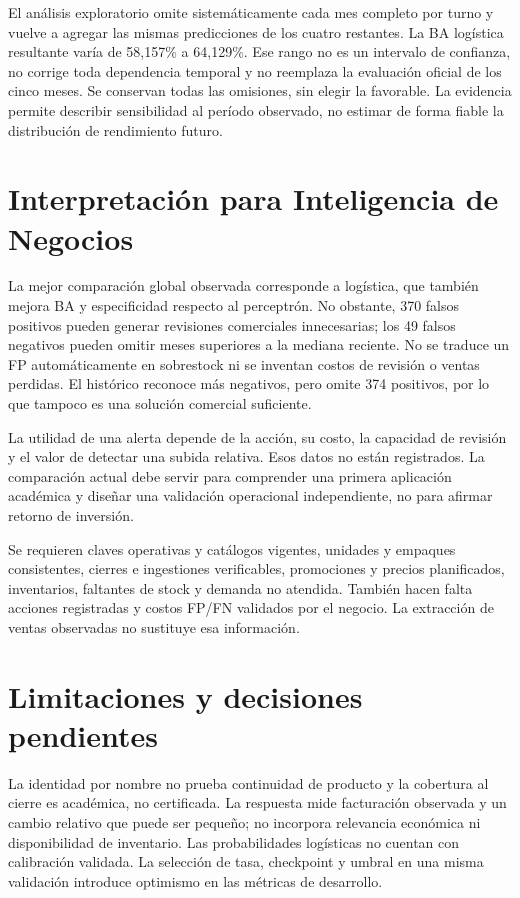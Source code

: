 El análisis exploratorio omite sistemáticamente cada mes completo por turno y vuelve a agregar las mismas predicciones de los cuatro restantes. La BA logística resultante varía de 58,157\% a 64,129\%. Ese rango no es un intervalo de confianza, no corrige toda dependencia temporal y no reemplaza la evaluación oficial de los cinco meses. Se conservan todas las omisiones, sin elegir la favorable. La evidencia permite describir sensibilidad al período observado, no estimar de forma fiable la distribución de rendimiento futuro.

\section{Interpretación para Inteligencia de Negocios}
La mejor comparación global observada corresponde a logística, que también mejora BA y especificidad respecto al perceptrón. No obstante, 370 falsos positivos pueden generar revisiones comerciales innecesarias; los 49 falsos negativos pueden omitir meses superiores a la mediana reciente. No se traduce un FP automáticamente en sobrestock ni se inventan costos de revisión o ventas perdidas. El histórico reconoce más negativos, pero omite 374 positivos, por lo que tampoco es una solución comercial suficiente.

La utilidad de una alerta depende de la acción, su costo, la capacidad de revisión y el valor de detectar una subida relativa. Esos datos no están registrados. La comparación actual debe servir para comprender una primera aplicación académica y diseñar una validación operacional independiente, no para afirmar retorno de inversión.

Se requieren claves operativas y catálogos vigentes, unidades y empaques consistentes, cierres e ingestiones verificables, promociones y precios planificados, inventarios, faltantes de stock y demanda no atendida. También hacen falta acciones registradas y costos FP/FN validados por el negocio. La extracción de ventas observadas no sustituye esa información.

\section{Limitaciones y decisiones pendientes}
La identidad por nombre no prueba continuidad de producto y la cobertura al cierre es académica, no certificada. La respuesta mide facturación observada y un cambio relativo que puede ser pequeño; no incorpora relevancia económica ni disponibilidad de inventario. Las probabilidades logísticas no cuentan con calibración validada. La selección de tasa, checkpoint y umbral en una misma validación introduce optimismo en las métricas de desarrollo.

